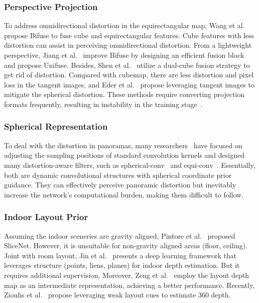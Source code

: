 \documentclass[10pt,times,mathptm,psfig,twocolumn,journals]{IEEEtran}
\begin{document}
\subsubsection{Perspective Projection}
To address omnidirectional distortion in the equirectangular map, Wang et al. \cite{2020BiFuse} propose Bifuse to fuse cube and equirectangular features. Cube features with less distortion can assist in perceiving omnidirectional distortion. From a lightweight perspective, Jiang et al.~\cite{Jiang_2021} improve Bifuse by designing an efficient fusion block and propose Unifuse. Besides, Shen et al.~\cite{shen2021distortion} utilize a dual-cube fusion strategy to get rid of distortion. Compared with cubemap, there are less distortion and pixel loss in the tangent images, and Eder et al.~\cite{Eder2020Tangent} propose leveraging tangent images to mitigate the spherical distortion. These methods require converting projection formats frequently, resulting in instability in the training stage~\cite{Chen_2021}.
\subsubsection{Spherical Representation}
To deal with the distortion in panoramas, many researchers~\cite{tateno2018distortion,eder2019mapped} have focused on adjusting the sampling positions of standard convolution kernels and designed many distortion-aware filters, such as spherical-conv~\cite{cohen2018spherical} and equi-conv~\cite{FernandezLabrador2020CornersFL}. Essentially, both are dynamic convolutional structures with spherical coordinate prior guidance. They can effectively perceive panoramic distortion but inevitably increase the network’s computational burden, making them difficult to follow.\subsubsection{Indoor Layout Prior}
Assuming the indoor sceneries are gravity aligned, Pintore et al.~\cite{Pintore_2021_CVPR} proposed SliceNet. However, it is unsuitable for non-gravity aligned areas (floor, ceiling). Joint with room layout, Jin et al.~\cite{Jin_2020_CVPR} presents a deep learning framework that leverages structure (points, liens, planes) for indoor depth estimation. But it requires additional supervision. Moreover, Zeng et al.~\cite{zeng2020joint} employ the layout depth map as an intermediate representation, achieving a better performance. Recently, Zioulis et al.~\cite{zioulis2022monocular} propose leveraging weak layout cues to estimate 360 depth.
\end{document}
